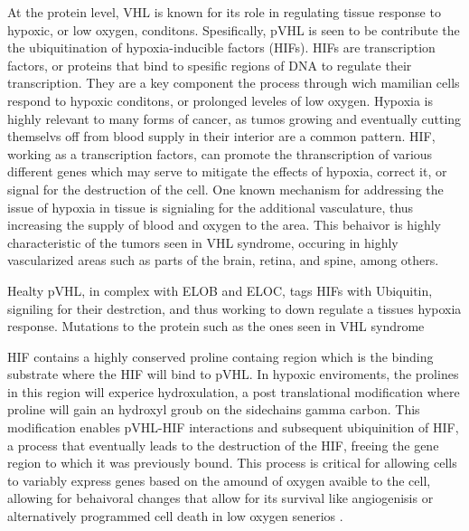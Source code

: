 At the protein level, VHL is known for its role in regulating tissue response to hypoxic, or low oxygen, conditons. 
Spesifically, pVHL is seen to be contribute the the ubiquitination of hypoxia-inducible factors (HIFs). 
HIFs are transcription factors, or proteins that bind to spesific regions of DNA to regulate their transcription.
They are a key component the process through wich mamilian cells respond to hypoxic conditons, or prolonged leveles of low oxygen. 
Hypoxia is highly relevant to many forms of cancer, as tumos growing and eventually cutting themselvs off from blood supply in their interior are a common pattern. HIF, working as a transcription factors, can promote the thranscription of various different genes which may serve to mitigate the effects of hypoxia, correct it, or signal for the destruction of the cell. One known mechanism for addressing the issue of hypoxia in tissue is signialing for the additional vasculature, thus increasing the supply of blood and oxygen to the area. This behaivor is highly characteristic of the tumors seen in VHL syndrome, occuring in highly vascularized areas such as parts of the brain, retina, and spine, among others. %


Healty pVHL, in complex with ELOB and ELOC,  tags HIFs with Ubiquitin, signiling for their destrction, and thus working to down regulate a tissues hypoxia response. Mutations to the protein such as the ones seen in VHL syndrome



HIF contains a highly conserved proline containg region which is the binding substrate where the HIF will bind to pVHL. 
In hypoxic enviroments, the prolines in this region will experice hydroxulation, a post translational modification where proline will gain an hydroxyl groub on the sidechains gamma carbon. This modification enables pVHL-HIF interactions and subsequent ubiquinition of HIF, a process that eventually leads to the destruction of the HIF, freeing the gene region to which it was previously bound. This process is critical for allowing cells to variably express genes based on the amound of oxygen avaible to the cell, allowing for behaivoral changes that allow for its survival like angiogenisis or alternatively programmed cell death in low oxygen senerios \cite{Carmeliet1998}. 

